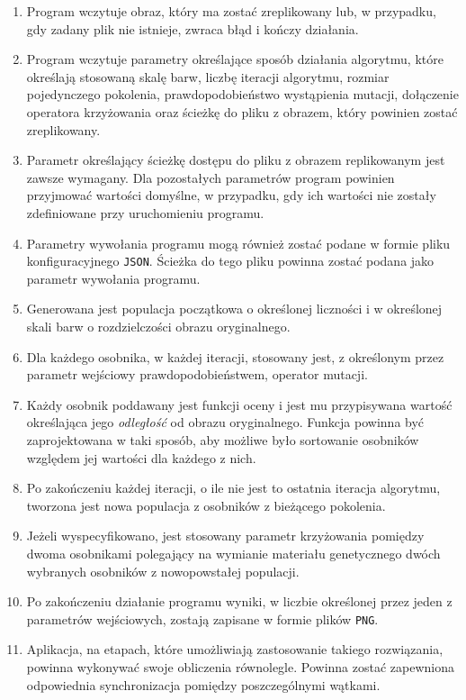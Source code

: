 \begin{enumerate}
    \item Program wczytuje obraz, który ma zostać zreplikowany lub, w przypadku, gdy zadany plik nie istnieje, zwraca błąd i kończy działania.
    \item Program wczytuje parametry określające sposób działania algorytmu, które określają stosowaną skalę barw, liczbę iteracji algorytmu, rozmiar pojedynczego pokolenia, prawdopodobieństwo wystąpienia mutacji, dołączenie operatora krzyżowania oraz ścieżkę do pliku z obrazem, który powinien zostać zreplikowany.
    \item Parametr określający ścieżkę dostępu do pliku z obrazem replikowanym jest zawsze wymagany. Dla pozostałych parametrów program powinien przyjmować wartości domyślne, w przypadku, gdy ich wartości nie zostały zdefiniowane przy uruchomieniu programu.
    \item Parametry wywołania programu mogą również zostać podane w formie pliku konfiguracyjnego \texttt{JSON}. Ścieżka do tego pliku powinna zostać podana jako parametr wywołania programu. 
    \item Generowana jest populacja początkowa o określonej liczności i w określonej skali barw o rozdzielczości obrazu oryginalnego.
    \item Dla każdego osobnika, w każdej iteracji, stosowany jest, z określonym przez parametr wejściowy prawdopodobieństwem, operator mutacji.
    \item Każdy osobnik poddawany jest funkcji oceny i jest mu przypisywana wartość określająca jego \textit{odległość} od obrazu oryginalnego. Funkcja powinna być zaprojektowana w taki sposób, aby możliwe było sortowanie osobników względem jej wartości dla każdego z nich.
    \item Po zakończeniu każdej iteracji, o ile nie jest to ostatnia iteracja algorytmu, tworzona jest nowa populacja z osobników z bieżącego pokolenia.
    \item Jeżeli wyspecyfikowano, jest stosowany parametr krzyżowania pomiędzy dwoma osobnikami polegający na wymianie materiału genetycznego dwóch wybranych osobników z nowopowstałej populacji.
    \item Po zakończeniu działanie programu wyniki, w liczbie określonej przez jeden z parametrów wejściowych, zostają zapisane w formie plików \texttt{PNG}.
    \item Aplikacja, na etapach, które umożliwiają zastosowanie takiego rozwiązania, powinna wykonywać swoje obliczenia równolegle. Powinna zostać zapewniona odpowiednia synchronizacja pomiędzy poszczególnymi wątkami.
\end{enumerate}

